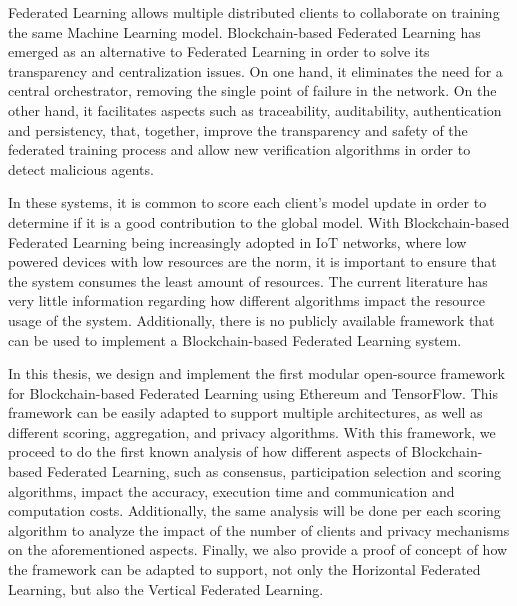 Federated Learning allows multiple distributed clients to collaborate on training the same Machine Learning model. Blockchain-based Federated Learning has emerged as an alternative to Federated Learning in order to solve its transparency and centralization issues. On one hand, it eliminates the need for a central orchestrator, removing the single point of failure in the network. On the other hand, it facilitates aspects such as traceability, auditability, authentication and persistency, that, together, improve the transparency and safety of the federated training process and allow new verification algorithms in order to detect malicious agents.

In these systems, it is common to score each client's model update in order to determine if it is a good contribution to the global model. With Blockchain-based Federated Learning being increasingly adopted in IoT networks, where low powered devices with low resources are the norm, it is important to ensure that the system consumes the least amount of resources. The current literature has very little information regarding how different algorithms impact the resource usage of the system. Additionally, there is no publicly available framework that can be used to implement a Blockchain-based Federated Learning system.

In this thesis, we design and implement the first modular open-source framework for Blockchain-based Federated Learning using Ethereum and TensorFlow. This framework can be easily adapted to support multiple architectures, as well as different scoring, aggregation, and privacy algorithms. With this framework, we proceed to do the first known analysis of how different aspects of Blockchain-based Federated Learning, such as consensus, participation selection and scoring algorithms, impact the accuracy, execution time and communication and computation costs. Additionally, the same analysis will be done per each scoring algorithm to analyze the impact of the number of clients and privacy mechanisms on the aforementioned aspects. Finally, we also provide a proof of concept of how the framework can be adapted to support, not only the Horizontal Federated Learning, but also the Vertical Federated Learning.